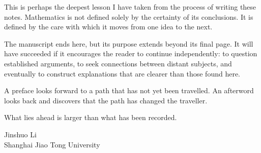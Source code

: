 This is perhaps the deepest lesson I have taken from the process of writing these notes. Mathematics is not defined solely by the certainty of its conclusions. It is defined by the care with which it moves from one idea to the next.

The manuscript ends here, but its purpose extends beyond its final page. It will have succeeded if it encourages the reader to continue independently: to question established arguments, to seek connections between distant subjects, and eventually to construct explanations that are clearer than those found here.

A preface looks forward to a path that has not yet been travelled. An afterword looks back and discovers that the path has changed the traveller.

What lies ahead is larger than what has been recorded.

\begin{flushright}
Jinshuo Li \\
Shanghai Jiao Tong University \\
\end{flushright}

\cleardoublepage